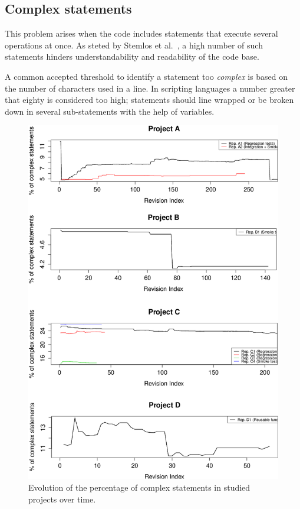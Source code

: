 \subsection{Complex statements}
This problem arises when the code includes statements that execute several operations at once. As steted by Stemlos et al.\ \cite{metrics_source_code}, a high number of such statements hinders understandability and readability of the code base.

A common accepted threshold to identify a statement too \textit{complex} is based on the number of characters used in a line. In scripting languages a number greater that eighty is considered too high; statements should line wrapped or be broken down in several sub-statements with the help of variables.

\begin{figure}[!htbp]
    \centering
    \includegraphics[width=\textwidth,keepaspectratio]{figure/results/rq1/perc-complex-statements.pdf}
    \caption{Evolution of the percentage of complex statements in studied projects over time.}
    \label{fig:perc-complex-statements}
\end{figure}

